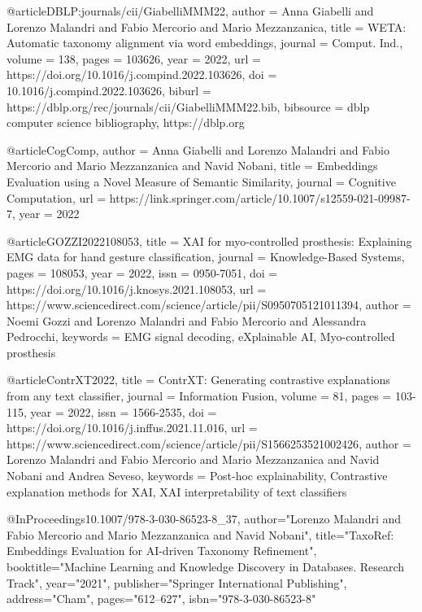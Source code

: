 {@article{DBLP:journals/cii/GiabelliMMM22,
  author    = {Anna Giabelli and
               Lorenzo Malandri and
               Fabio Mercorio and
               Mario Mezzanzanica},
  title     = { WETA: Automatic taxonomy alignment via word embeddings},
  journal   = {Comput. Ind.},
  volume    = {138},
  pages     = {103626},
  year      = {2022},
  url       = {https://doi.org/10.1016/j.compind.2022.103626},
  doi       = {10.1016/j.compind.2022.103626},
  biburl    = {https://dblp.org/rec/journals/cii/GiabelliMMM22.bib},
  bibsource = {dblp computer science bibliography, https://dblp.org}
}


@article{CogComp,
author = {Anna Giabelli and Lorenzo Malandri and Fabio Mercorio and Mario Mezzanzanica and Navid Nobani},
title = {Embeddings Evaluation using a Novel Measure of Semantic Similarity},
journal = {Cognitive Computation},
url = {https://link.springer.com/article/10.1007/s12559-021-09987-7},
year = {2022}
}

@article{GOZZI2022108053,
title = {XAI for myo-controlled prosthesis: Explaining EMG data for hand gesture classification},
journal = {Knowledge-Based Systems},
pages = {108053},
year = {2022},
issn = {0950-7051},
doi = {https://doi.org/10.1016/j.knosys.2021.108053},
url = {https://www.sciencedirect.com/science/article/pii/S0950705121011394},
author = {Noemi Gozzi and Lorenzo Malandri and Fabio Mercorio and Alessandra Pedrocchi},
keywords = {EMG signal decoding, eXplainable AI, Myo-controlled prosthesis}
}

@article{ContrXT2022,
title = {ContrXT: Generating contrastive explanations from any text classifier},
journal = {Information Fusion},
volume = {81},
pages = {103-115},
year = {2022},
issn = {1566-2535},
doi = {https://doi.org/10.1016/j.inffus.2021.11.016},
url = {https://www.sciencedirect.com/science/article/pii/S1566253521002426},
author = {Lorenzo Malandri and Fabio Mercorio and Mario Mezzanzanica and Navid Nobani and Andrea Seveso},
keywords = {Post-hoc explainability, Contrastive explanation methods for XAI, XAI interpretability of text classifiers}
}

@InProceedings{10.1007/978-3-030-86523-8_37,
author="Lorenzo Malandri and Fabio Mercorio and Mario Mezzanzanica and Navid Nobani",
title="TaxoRef: Embeddings Evaluation for AI-driven Taxonomy Refinement",
booktitle="Machine Learning and Knowledge Discovery in Databases. Research Track",
year="2021",
publisher="Springer International Publishing",
address="Cham",
pages="612--627",
isbn="978-3-030-86523-8"
}


}
